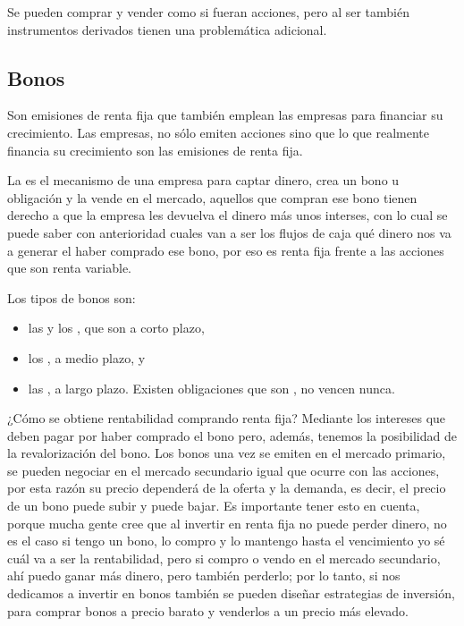 Se pueden comprar y vender como si fueran acciones, pero al ser también instrumentos derivados tienen una problemática adicional.


\subsection{Bonos}

Son emisiones de renta fija que también emplean las empresas para financiar su crecimiento. Las empresas, no sólo emiten acciones sino que lo que realmente financia su crecimiento son las emisiones de renta fija.

La  es el mecanismo de una empresa para captar dinero, crea un bono u obligación y la vende en el mercado, aquellos que compran ese bono tienen derecho a que la empresa les devuelva el dinero más unos interses, con lo cual se puede saber con anterioridad cuales van a ser los flujos de caja qué dinero nos va a generar el haber comprado ese bono, por eso es renta fija frente a las acciones que son renta variable.

Los tipos de bonos son:
\begin{itemize}
    \item las  y los , que son a corto plazo,
    \item los , a medio plazo, y 
    \item las , a largo plazo. Existen obligaciones que son , no vencen nunca.
\end{itemize}

¿Cómo se obtiene rentabilidad comprando renta fija? Mediante los intereses que deben pagar por haber comprado el bono pero, además, tenemos la posibilidad de la revalorización del bono. Los bonos una vez se emiten en el mercado primario, se pueden negociar en el mercado secundario igual que ocurre con las acciones, por esta razón su precio dependerá de la oferta y la demanda, es decir, el precio de un bono puede subir y puede bajar. Es importante tener esto en cuenta, porque mucha gente cree que al invertir en renta fija no puede perder dinero, no es el caso si tengo un bono, lo compro y lo mantengo hasta el vencimiento yo sé cuál va a ser la rentabilidad, pero si compro o vendo en el mercado secundario, ahí puedo ganar más dinero, pero también perderlo; por lo tanto, si nos dedicamos a invertir en bonos también se pueden diseñar estrategias de inversión, para comprar bonos a precio barato y venderlos a un precio más elevado.

